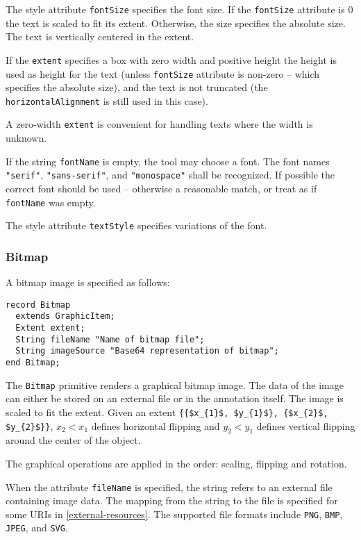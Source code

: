 The style attribute \lstinline!fontSize! specifies the font size. If the \lstinline!fontSize!
attribute is 0 the text is scaled to fit its extent. Otherwise, the size
specifies the absolute size. The text is vertically centered in the extent.

If the \lstinline!extent! specifies a box with zero width and positive height the
height is used as height for the text (unless \lstinline!fontSize! attribute is
non-zero -- which specifies the absolute size), and the text is not
truncated (the \lstinline!horizontalAlignment! is still used in this case).

\begin{nonnormative}
A zero-width \lstinline!extent! is convenient for handling texts where the width is unknown.
\end{nonnormative}

If the string \lstinline!fontName! is empty, the tool may choose a font.  The font names \lstinline!"serif"!, \lstinline!"sans-serif"!, and \lstinline!"monospace"! shall be recognized.  If possible
the correct font should be used -- otherwise a reasonable match, or treat as if \lstinline!fontName! was empty.

The style attribute \lstinline!textStyle! specifies variations of the font.

\subsubsection{Bitmap}\label{bitmap}

A bitmap image is specified as follows:
\begin{lstlisting}[language=modelica]
record Bitmap
  extends GraphicItem;
  Extent extent;
  String fileName "Name of bitmap file";
  String imageSource "Base64 representation of bitmap";
end Bitmap;
\end{lstlisting}%
The \lstinline!Bitmap! primitive renders a graphical bitmap image.
The data of the image can either be stored on an external file or in the annotation itself.
The image is scaled to fit the extent.
Given an extent \lstinline!{{$x_{1}$, $y_{1}$}, {$x_{2}$, $y_{2}$}}!, $x_{2} < x_{1}$ defines horizontal flipping and $y_{2} < y_{1}$ defines vertical flipping around the center of the object.

The graphical operations are applied in the order: scaling, flipping and rotation.

When the attribute \lstinline!fileName! is specified, the string refers to an
external file containing image data. The mapping from the string to the
file is specified for some URIs in \cref{external-resources}. The supported file
formats include \lstinline!PNG!, \lstinline!BMP!, \lstinline!JPEG!,
and \lstinline!SVG!.

